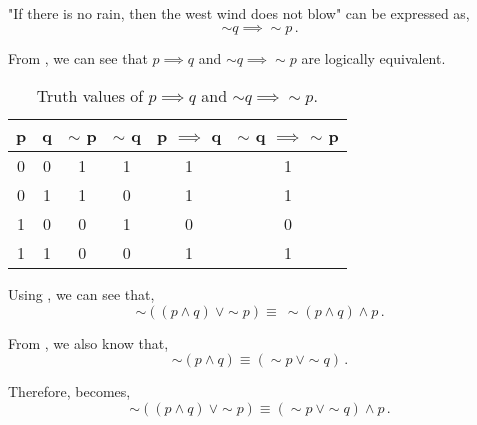 \begin{subquestions}
\begin{subsubquestions}
\begin{subsubsubquestions}

\subsubsubquestion

"If there is no rain, then the west wind does not blow" can be expressed as,
\begin{equation}
	\sim q \implies \sim p\,.
\end{equation}

\end{subsubsubquestions}


\subsubquestion

From , we can see that $p \implies q$ and $\sim q \implies \sim p$ are logically equivalent.
\begin{table}[ht]
	\centering
	\begin{tabular}{|c|c|c|c|c|c|}
		\hline
		p & q & $\sim$ p & $\sim$ q & p $\implies$ q & $\sim$ q $\implies$ $\sim$ p \\
		\hline
		0 & 0 & 1 & 1 & 1 & 1 \\
	    0 & 1 & 1 & 0 & 1 & 1 \\
	    1 & 0 & 0 & 1 & 0 & 0 \\
	    1 & 1 & 0 & 0 & 1 & 1 \\
	    \hline
	\end{tabular}
	\caption{\label{2011:q1:tab:TruthTab2} Truth values of  $p \implies q$ and $\sim q \implies \sim p$.}
\end{table}

\end{subsubquestions}


\subquestion

Using , we can see that,
\begin{equation}	
	\sim((p \land q) ~\lor \sim p)  \equiv ~\sim(p \land q) \land p \,. \label{2012BoolEqn}
\end{equation}

From , we also know that,
\begin{equation}
	\sim(p \land q) \equiv (\sim p ~\lor \sim q) \,.
\end{equation}

Therefore,  becomes,
\begin{equation}
	\sim((p \land q) ~\lor \sim p)  \equiv (\sim p ~\lor \sim q) \land p \,.
\end{equation}


\end{subquestions}
